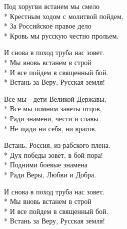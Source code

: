 \medskip

\begin{minipage}{\linewidth}
Под хоругви встанем мы смело\\*
Крестным ходом с молитвой пойдем,\\*
За Российское правое дело\\*
Кровь мы русскую честно прольем.\\
\end{minipage}\par\medskip\nobreak

\medskip

\begin{minipage}{\linewidth}
\hspace*{1.5em}И снова в поход труба нас зовет.\\*
\hspace*{1.5em}Мы вновь встанем в строй\\*
\hspace*{1.5em}И все пойдем в священный бой.\\*
\hspace*{1.5em}Встань за Веру, Русская земля!\\
\end{minipage}\par\medskip\nobreak

\medskip

\begin{minipage}{\linewidth}
Все мы - дети Великой Державы,\\*
Все мы помним заветы отцов,\\*
Ради знамени, чести и славы\\*
Не щади ни себя, ни врагов.\\
\end{minipage}\par\medskip\nobreak

\medskip

\begin{minipage}{\linewidth}
Встань, Россия, из рабского плена.\\*
Дух победы зовет, в бой пора!\\*
Подними боевые знамена\\*
Ради Веры, Любви и Добра.\\
\end{minipage}\par\medskip\nobreak

\medskip

\begin{minipage}{\linewidth}
\hspace*{1.5em}И снова в поход труба нас зовет.\\*
\hspace*{1.5em}Мы вновь встанем в строй\\*
\hspace*{1.5em}И все пойдем в священный бой.\\*
\hspace*{1.5em}Встань за Веру, Русская земля!\\
\end{minipage}

